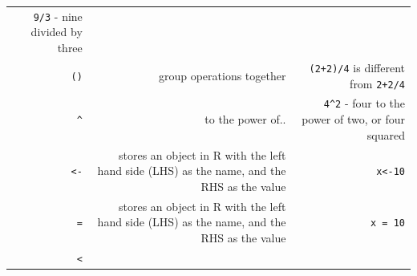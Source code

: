 \documentclass[]{book}
\begin{document}
\begin{longtable}[]{@{}rrr@{}}
\begin{minipage}[t]{0.30\columnwidth}
\texttt{9/3} - nine divided by three\strut
\end{minipage}\tabularnewline
\begin{minipage}[t]{0.30\columnwidth}\raggedleft
\texttt{()}\strut
\end{minipage} & \begin{minipage}[t]{0.30\columnwidth}\raggedleft
group operations together\strut
\end{minipage} & \begin{minipage}[t]{0.30\columnwidth}\raggedleft
\texttt{(2+2)/4} is different from \texttt{2+2/4}\strut
\end{minipage}\tabularnewline
\begin{minipage}[t]{0.30\columnwidth}\raggedleft
\texttt{\^{}}\strut
\end{minipage} & \begin{minipage}[t]{0.30\columnwidth}\raggedleft
to the power of..\strut
\end{minipage} & \begin{minipage}[t]{0.30\columnwidth}\raggedleft
\texttt{4\^{}2} - four to the power of two, or four squared\strut
\end{minipage}\tabularnewline
\begin{minipage}[t]{0.30\columnwidth}\raggedleft
\texttt{\textless{}-}\strut
\end{minipage} & \begin{minipage}[t]{0.30\columnwidth}\raggedleft
stores an object in R with the left hand side (LHS) as the name, and the RHS as the value\strut
\end{minipage} & \begin{minipage}[t]{0.30\columnwidth}\raggedleft
\texttt{x\textless{}-10}\strut
\end{minipage}\tabularnewline
\begin{minipage}[t]{0.30\columnwidth}\raggedleft
\texttt{=}\strut
\end{minipage} & \begin{minipage}[t]{0.30\columnwidth}\raggedleft
stores an object in R with the left hand side (LHS) as the name, and the RHS as the value\strut
\end{minipage} & \begin{minipage}[t]{0.30\columnwidth}\raggedleft
\texttt{x\ =\ 10}\strut
\end{minipage}\tabularnewline
\begin{minipage}[t]{0.30\columnwidth}\raggedleft
\texttt{\textless{}}\strut
\end{minipage} & \begin{minipage}[t]{0.30\columnwidth}\raggedleft

\end{minipage}
\end{longtable}
\end{document}
